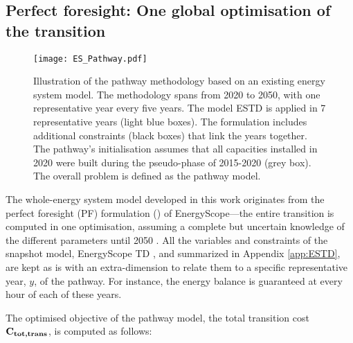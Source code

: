 \subsection{Perfect foresight: One global optimisation of the transition}
\label{subsec:meth:PF}

\begin{figure}[htbp!]
\centering
\texttt{[image: ES\_Pathway.pdf]}
\caption{Illustration of the pathway methodology based on an existing energy system model. The methodology spans from 2020 to 2050, with one representative year every five years. The model \acrfull{ESTD} is applied in 7 representative years (light blue boxes). The formulation includes additional constraints (black boxes) that link the years together. The pathway's initialisation assumes that all capacities installed in 2020 were built during the pseudo-phase of 2015-2020 (grey box). The overall problem is defined as the pathway model.}
\label{fig:meth_path_methodology_core}
\end{figure}

The whole-energy system model developed in this work originates from the perfect foresight (PF) formulation () of EnergyScope---the entire transition is computed in one optimisation, assuming a complete but uncertain knowledge of the different parameters until 2050 \cite{limpens2024pathway}. All the variables and constraints of the snapshot model, EnergyScope TD \cite{limpens2019energyscope}, and summarized in Appendix \ref{app:ESTD}, are kept as is with an extra-dimension to relate them to a specific representative year, $y$, of the pathway. For instance, the energy balance is guaranteed at every hour of each of these years. 

The optimised objective of the pathway model, \ie the total transition cost $\textbf{C\textsubscript{tot,trans}}$, is computed as follows: 


\begingroup
\belowdisplayskip=2pt
\abovedisplayskip=2pt

